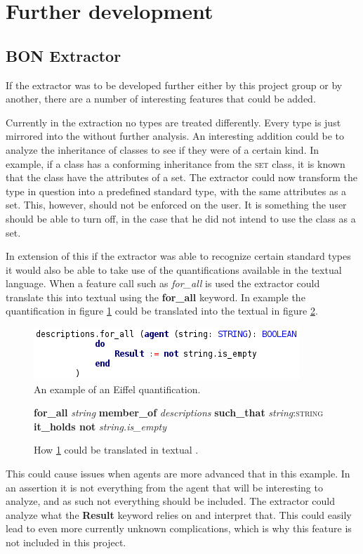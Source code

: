 \section{Further development}
\subsection{BON Extractor}
If the \bon{ } extractor was to be developed further either by this project group or by another, there are a number of interesting features that could be added. 

Currently in the \bon{ } extraction no types are treated differently. Every type is just mirrored into the \bon{ } without further analysis. An interesting addition could be to analyze the inheritance of classes to see if they were of a certain kind. In example, if a class has a conforming inheritance from the \textsc{set} class, it is known that the class have the attributes of a set. The extractor could now transform the type in question into a predefined standard type, with the same attributes as a set. This, however, should not be enforced on the user. It is something the user should be able to turn off, in the case that he did not intend to use the class as a set.

In extension of this if the extractor was able to recognize certain standard types it would also be able to take use of the quantifications available in the textual \bon{ } language. When a feature call such as \textit{for\_all} is used the extractor could translate this into textual \bon{ } using the \textbf{for\_all} keyword. In example the quantification in figure \ref{fig:agent-for-all} could be translated into the textual \bon{ } in figure \ref{fig:bon-for-all}.
\begin{figure}[h]
\centerline{
\includegraphics[scale=0.7]{images/agent_example.png} 
}
\caption{An example of an Eiffel quantification.}
\label{fig:agent-for-all}
\end{figure}

\begin{figure}[h]
\centerline{
\footnotesize{\textbf{for\_all} \textit{string} \textbf{member\_of} \textit{descriptions} \textbf{such\_that} \textit{string}:\textsc{string} \textbf{it\_holds not} \textit{string.is\_empty}}
}
\caption{How \ref{fig:agent-for-all} could be translated in textual \bon.}
\label{fig:bon-for-all}
\end{figure}
This could cause issues when agents are more advanced that in this example. In an assertion it is not everything from the agent that will be interesting to analyze, and as such not everything should be included. The extractor could analyze what the \textbf{Result} keyword relies on and interpret that. This could easily lead to even more currently unknown complications, which is why this feature is not included in this project.

